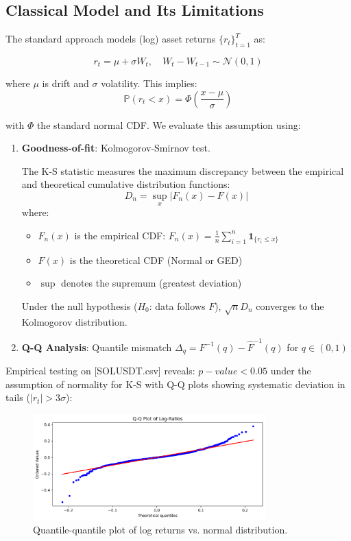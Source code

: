 \documentclass[12pt]{article}
\begin{document}
\subsection{Classical Model and Its Limitations}
The standard approach models (log) asset returns $\{r_t\}_{t=1}^T$ as:

\begin{equation}
    r_t = \mu + \sigma W_t, \quad W_t - W_{t-1} \sim \mathcal{N}(0,1)
\end{equation}

where $\mu$ is drift and $\sigma$ volatility. This implies:
\begin{equation}
    \mathbb{P}(r_t < x) = \Phi\left(\frac{x-\mu}{\sigma}\right)
\end{equation}

with $\Phi$ the standard normal CDF. We evaluate this assumption using:

\begin{enumerate}
    \item \textbf{Goodness-of-fit}: Kolmogorov-Smirnov test.

    The K-S statistic measures the maximum discrepancy between the empirical and theoretical cumulative distribution functions:
    \begin{equation}
    D_n = \sup_{x} \left| F_n(x) - F(x) \right|
    \end{equation}
    where:
    \begin{itemize}
        \item $F_n(x)$ is the empirical CDF: $F_n(x) = \frac{1}{n} \sum_{i=1}^n \mathbf{1}_{\{r_i \leq x\}}$
        \item $F(x)$ is the theoretical CDF (Normal or GED)
        \item $\sup$ denotes the supremum (greatest deviation)
    \end{itemize}
    Under the null hypothesis ($H_0$: data follows $F$), $\sqrt{n}D_n$ converges to the Kolmogorov distribution.

    \item \textbf{Q-Q Analysis}: Quantile mismatch $\Delta_q = F^{-1}(q) - \hat{F}^{-1}(q)$ for $q \in (0,1)$
\end{enumerate}

Empirical testing on [SOLUSDT.csv] reveals:
$p-value < 0.05$ under the assumption of normality for K-S with Q-Q plots showing systematic deviation in tails ($|r_t| > 3\sigma$):

\begin{figure}[H]
    \centering
    \includegraphics[width=0.8\textwidth]{qq_plot2.png}
    \caption{Quantile-quantile plot of log returns vs. normal distribution.}
    \label{fig:qq}
\end{figure}
\end{document}

